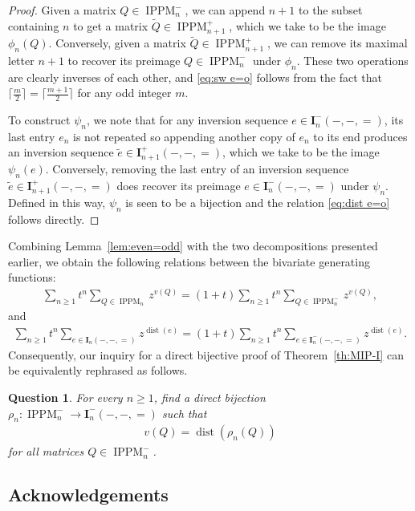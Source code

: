 \documentclass[12pt,reqno]{amsart}
\numberwithin{equation}{section}
\theoremstyle{theorem}
\newtheorem{question}[theorem]{Question}
\theoremstyle{definition}
\theoremstyle{named}
\newcommand{\dist}{\operatorname{dist}}
\newcommand{\sw}{v}
\newcommand{\bI}{\mathbf{I}}
\newcommand{\IPPM}{\operatorname{IPPM}}
\begin{document}
\begin{proof}
	Given a matrix $Q\in \IPPM_n^-$, we can append $n+1$ to the subset containing $n$ to get a matrix $\widetilde{Q}\in\IPPM_{n+1}^+$, which we take to be the image $\phi_n(Q)$. Conversely, given a matrix $\widetilde{Q}\in\IPPM_{n+1}^+$, we can remove its maximal letter $n+1$ to recover its preimage $Q\in\IPPM_n^-$ under $\phi_n$. These two operations are clearly inverses of each other, and \eqref{eq:sw e=o} follows from the fact that $\lceil\frac{m}{2}\rceil=\lceil\frac{m+1}{2}\rceil$ for any odd integer $m$.
	
	To construct $\psi_n$, we note that for any inversion sequence $e\in\bI_n^-(-,-,=)$, its last entry $e_n$ is not repeated so appending another copy of $e_n$ to its end produces an inversion sequence $\tilde{e}\in\bI_{n+1}^+(-,-,=)$, which we take to be the image $\psi_n(e)$. Conversely, removing the last entry of an inversion sequence $\tilde{e}\in\bI_{n+1}^+(-,-,=)$ does recover its preimage $e\in \bI_n^-(-,-,=)$ under $\psi_n$. Defined in this way, $\psi_n$ is seen to be a bijection and the relation \eqref{eq:dist e=o} follows directly.
\end{proof}

Combining Lemma~\ref{lem:even=odd} with the two decompositions presented earlier, we obtain the following relations between the bivariate generating functions:
\begin{align*}
	\sum_{n\ge 1}t^n\sum_{Q\in\IPPM_n}z^{\sw(Q)} = (1+t)\sum_{n\ge 1}t^n\sum_{Q\in\IPPM_n^-}z^{\sw(Q)},
\end{align*}
and
\begin{align*}
	\sum_{n\ge 1}t^n\sum_{e\in\bI_n(-,-,=)}z^{\dist(e)} = (1+t)\sum_{n\ge 1}t^n\sum_{e\in\bI_n^-(-,-,=)}z^{\dist(e)}.
\end{align*}
Consequently, our inquiry for a direct bijective proof of Theorem~\ref{th:MIP-I} can be equivalently rephrased as follows.

\begin{question}
	For every $n\ge 1$, find a direct bijection $\rho_n:\IPPM_n^- \to \bI_n^-(-,-,=)$ such that
	\begin{align*}
		\sw(Q) = \dist(\rho_n(Q))
	\end{align*}
	for all matrices $Q\in\IPPM_n^-$.
\end{question}

\subsection*{Acknowledgements}
\end{document}

